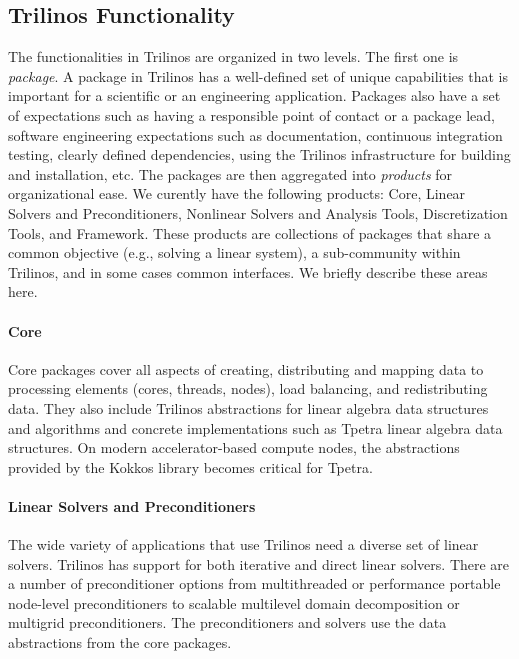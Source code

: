 


\subsection{Trilinos Functionality}

The functionalities in Trilinos are organized in two levels. The first one is \textit{package}. A package in Trilinos has a well-defined set of unique capabilities that is important for a scientific or an engineering application. Packages also have a set of expectations such as having a responsible point of contact or a package lead, software engineering expectations such as documentation, continuous integration testing, clearly defined dependencies, using the Trilinos infrastructure for building and installation, etc. The packages are then aggregated into \emph{products} for organizational ease. We curently have the following products: Core, Linear Solvers and Preconditioners, Nonlinear Solvers and Analysis Tools, Discretization Tools, and Framework. These products are collections of packages that share a common objective (e.g., solving a linear system), a sub-community within Trilinos, and in some cases common interfaces. We briefly describe these areas here.

\paragraph{Core} Core packages cover all aspects of creating, distributing and mapping data to processing elements (cores, threads, nodes), load balancing, and redistributing data. They also include Trilinos abstractions for linear algebra data structures and algorithms and concrete implementations such as Tpetra linear algebra data structures. On modern accelerator-based compute nodes, the abstractions provided by the Kokkos library becomes critical for Tpetra.
 
\paragraph{Linear Solvers and Preconditioners} The wide variety of applications that use Trilinos need a diverse set of linear solvers. Trilinos has support for both iterative and direct linear solvers. There are a number of preconditioner options from multithreaded or performance portable node-level preconditioners to scalable multilevel domain decomposition or multigrid preconditioners. The preconditioners and solvers use the data abstractions from the core packages.

